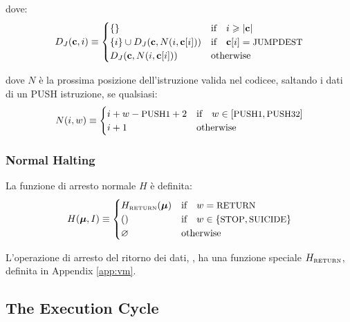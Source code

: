 \documentclass[9pt,oneside]{amsart}
\begin{document}
\begin{multicols}{2}
dove:
\begin{equation}
D_J(\mathbf{c}, i) \equiv \begin{cases}
\{\} & \text{if} \quad i \geqslant |\mathbf{c}|  \\
\{ i \} \cup D_J(\mathbf{c}, N(i, \mathbf{c}[i])) & \text{if} \quad \mathbf{c}[i] = \text{\small JUMPDEST} \\
D_J(\mathbf{c}, N(i, \mathbf{c}[i])) & \text{otherwise} \\
\end{cases}
\end{equation}

dove $N$ è la prossima posizione dell'istruzione valida nel codicee, saltando i dati di un {\small PUSH} istruzione, se qualsiasi:
\begin{equation}
N(i, w) \equiv \begin{cases}
i + w - \text{\small PUSH1} + 2 & \text{if} \quad w \in [\text{\small PUSH1}, \text{\small PUSH32}] \\
i + 1 & \text{otherwise} \end{cases}
\end{equation}

\subsubsection{Normal Halting}

La funzione di arresto normale $H$ è definita:
\begin{equation}
H(\boldsymbol{\mu}, I) \equiv \begin{cases}
H_{\text{\tiny RETURN}}(\boldsymbol{\mu}) & \text{if} \quad w = \text{\small RETURN} \\
() & \text{if} \quad w \in \{ \text{\small STOP}, \text{\small SUICIDE} \} \\
\varnothing & \text{otherwise}
\end{cases}
\end{equation}

L'operazione di arresto del ritorno dei dati, , ha una funzione speciale $H_{\text{\tiny RETURN}}$, definita in Appendix \ref{app:vm}.

\subsection{The Execution Cycle}


\end{multicols}
\end{document}
